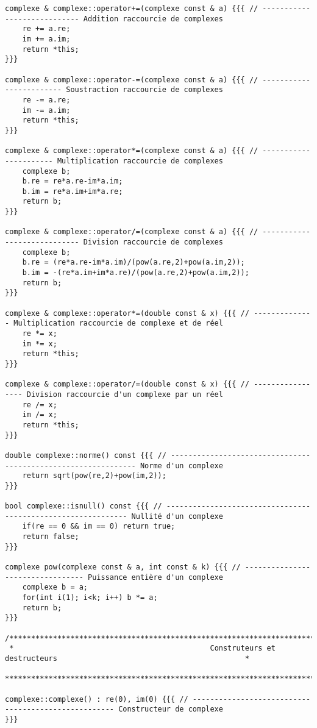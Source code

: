 \documentclass[a4paper]{article}
\begin{document}
\begin{verbatim}
complexe & complexe::operator+=(complexe const & a) {{{ // ---------------------------- Addition raccourcie de complexes
    re += a.re;
    im += a.im;
    return *this;
}}}

complexe & complexe::operator-=(complexe const & a) {{{ // ------------------------ Soustraction raccourcie de complexes
    re -= a.re;
    im -= a.im;
    return *this;
}}}

complexe & complexe::operator*=(complexe const & a) {{{ // ---------------------- Multiplication raccourcie de complexes
    complexe b;
    b.re = re*a.re-im*a.im;
    b.im = re*a.im+im*a.re;
    return b;
}}}

complexe & complexe::operator/=(complexe const & a) {{{ // ---------------------------- Division raccourcie de complexes
    complexe b;
    b.re = (re*a.re-im*a.im)/(pow(a.re,2)+pow(a.im,2));
    b.im = -(re*a.im+im*a.re)/(pow(a.re,2)+pow(a.im,2));
    return b;
}}}

complexe & complexe::operator*=(double const & x) {{{ // -------------- Multiplication raccourcie de complexe et de réel
    re *= x;
    im *= x;
    return *this;
}}}

complexe & complexe::operator/=(double const & x) {{{ // ----------------- Division raccourcie d'un complexe par un réel
    re /= x;
    im /= x;
    return *this;
}}}

double complexe::norme() const {{{ // -------------------------------------------------------------- Norme d'un complexe
    return sqrt(pow(re,2)+pow(im,2));
}}}

bool complexe::isnull() const {{{ // ------------------------------------------------------------- Nullité d'un complexe
    if(re == 0 && im == 0) return true;
    return false;
}}}

complexe pow(complexe const & a, int const & k) {{{ // --------------------------------- Puissance entière d'un complexe
    complexe b = a;
    for(int i(1); i<k; i++) b *= a;
    return b;
}}}
        
/**********************************************************************************************************************
 *                                             Construteurs et destructeurs                                           *
 **********************************************************************************************************************/

complexe::complexe() : re(0), im(0) {{{ // ---------------------------------------------------- Constructeur de complexe
}}}


\end{verbatim}
\end{document}
